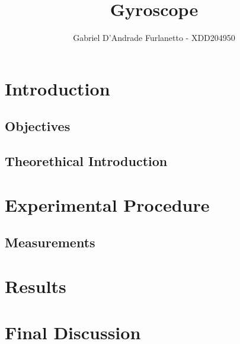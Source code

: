 \documentclass[a4paper,12pt]{article}
\begin{document}
\title{Gyroscope}
\author{Gabriel D'Andrade Furlanetto - XDD204950}
\maketitle
\pagebreak 

\section{Introduction}

\subsection{Objectives}

\subsection{Theorethical Introduction}

\section{Experimental Procedure}

\subsection{Measurements}

\section{Results}

\section{Final Discussion}
\end{document}
